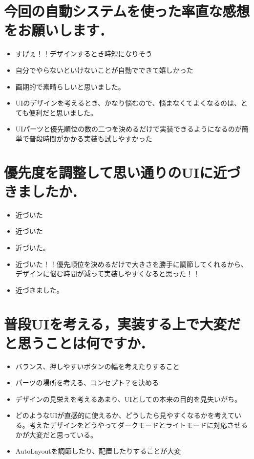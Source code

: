 \section{今回の自動システムを使った率直な感想をお願いします．}
\begin{itemize}
	\item すげぇ！！デザインするとき時短になりそう
	\item 自分でやらないといけないことが自動でできて嬉しかった
	\item 画期的で素晴らしいと思いました。
	\item UIのデザインを考えるとき、かなり悩むので、悩まなくてよくなるのは、とても便利だと思いました。
	\item UIパーツと優先順位の数の二つを決めるだけで実装できるようになるのが簡単で普段時間がかかる実装も試しやすかった
\end{itemize}

\section{優先度を調整して思い通りのUIに近づきましたか．}
\begin{itemize}
	\item 近づいた
	\item 近づいた
	\item 近づいた。
	\item 近づいた！！優先順位を決めるだけで大きさを勝手に調節してくれるから、デザインに悩む時間が減って実装しやすくなると思った！！
	\item 近づきました。
\end{itemize}

\section{普段UIを考える，実装する上で大変だと思うことは何ですか．}
\begin{itemize}
	\item バランス、押しやすいボタンの幅を考えたりすること
	\item パーツの場所を考える、コンセプト？を決める
	\item デザインの見栄えを考えるあまり、UIとしての本来の目的を見失いがち。
	\item どのようなUIが直感的に使えるか、どうしたら見やすくなるかを考えている。考えたデザインをどうやってダークモードとライトモードに対応させるかが大変だと思っている。
	\item AutoLayoutを調節したり、配置したりすることが大変

\end{itemize}

